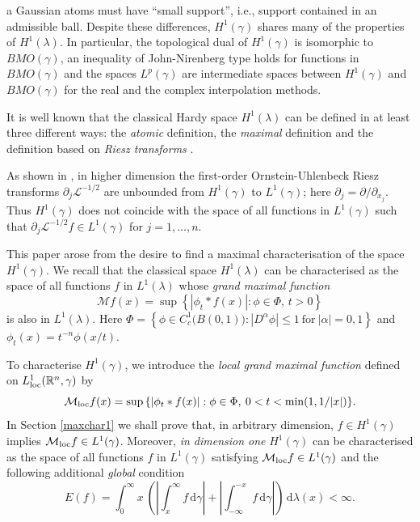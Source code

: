 \documentclass{amsart}                 %
\numberwithin{equation}{section}
\newcommand\set[1]{{\left\{#1\right\}}}
\renewcommand\mod[1]{\left\vert{#1}\right\vert}
\newcommand\wrt{\,\mathrm{d}}
\newcommand\1{{\bf 1}}
\newcommand\BR{\mathbb{R}} \newcommand\BRd{\mathbb{R}^d}
\newcommand\cL{\mathcal{L}}  \newcommand\fL{\mathfrak{L}}
\newcommand\cM{\mathcal{M}}  \newcommand\fM{\mathfrak{M}}
\newcommand\mlo {\cM_{\textnormal{loc}}}
\newcommand\huat[1]{H^1(#1)}
\begin{document}
a Gaussian atoms must have ``small support'',
i.e.,  support  contained in an admissible ball. Despite these 
differences, $H^1(\gamma)$ shares many of the properties of $H^1(\lambda)$. 
In particular, the topological
dual of $\huat{\gamma}$ is isomorphic to $BMO(\gamma)$, an 
inequality of John-Nirenberg type holds for functions in
$BMO(\gamma)$ and the spaces $L^p(\gamma)$ are intermediate 
spaces between $\huat{\gamma}$ and $BMO(\gamma)$ for the real 
and the complex
interpolation methods.\par
It is well known that the classical Hardy space $H^1(\lambda)$ can be defined
in at least three different ways:  the \emph
{atomic} definition, the \emph{maximal} definition and the definition 
based on \emph{Riesz transforms} \cite{CW, St2}.
\par
As shown in \cite{MMS2}, in higher dimension the 
first-order Ornstein-Uhlenbeck Riesz transforms $\partial_j\cL^{-1/2}$ are 
unbounded from $\huat{\gamma}$ 
to $L^1(\gamma)$; here $\partial_j = \partial/\partial_{x_j}$. Thus  $\huat{\gamma}$ 
does not coincide with 
the space of all functions in $L^1(\gamma)$ such that
 $\partial_j\cL^{-1/2}f \in L^1(\gamma)$ for $j=1,\ldots,n$. \par
This paper arose from the desire to find a maximal characterisation of 
the space $\huat{\gamma}$.  We recall that the classical space $H^1(\lambda)$ 
can be characterised as the space of all functions $f$ in $L^1(\lambda)$ whose 
\emph{grand maximal function} 
\begin{equation}\label{gmf}
\cM f(x)=\sup\set{\mod{\phi_t*f(x)}: {\phi\in \Phi},\, t>0}
\end{equation}
is also in $L^1(\lambda)$. Here
 $\Phi=\set{\phi \in C_c^1\big(B(0,1)\big): \mod{D^{\alpha}\phi}\le 1 \:
\mathrm{for} \: \mod{\alpha}=0,1}$
and $\phi_t(x)=t^{-n}\phi(x/t)$.\par  
To characterise $H^1(\gamma)$, we introduce the \emph{local 
grand maximal function} defined on $L^1_{\rm loc}(\BR^n,\gamma)$ by
$$
\mlo f(x)=\sup\set{\mod{\phi_t*f(x)}: {\phi\in \Phi},\: 0<t< \min(1, 1/|x|)}.
$$
In Section \ref{maxchar1} we shall prove that, in arbitrary dimension,
$f\in \huat{\gamma}$ implies $\mlo f\in L^1(\gamma)$. Moreover, \emph
{in dimension one}  $\huat{\gamma}$ can be characterised 
as the space of all functions $f$ in $L^1(\gamma)$ satisfying 
$\mlo  f \in L^1(\gamma)$ and  the following  additional \emph{global} 
condition
\begin{equation}\label{GC}
E(f)=\int_{0}^\infty x\ \left(\mod{\int_x^\infty f\wrt\gamma}+\mod{\int_{-
\infty}^{-x} f\wrt \gamma}\right) \wrt\lambda(x)<\infty.
\end{equation}
\end{document}
